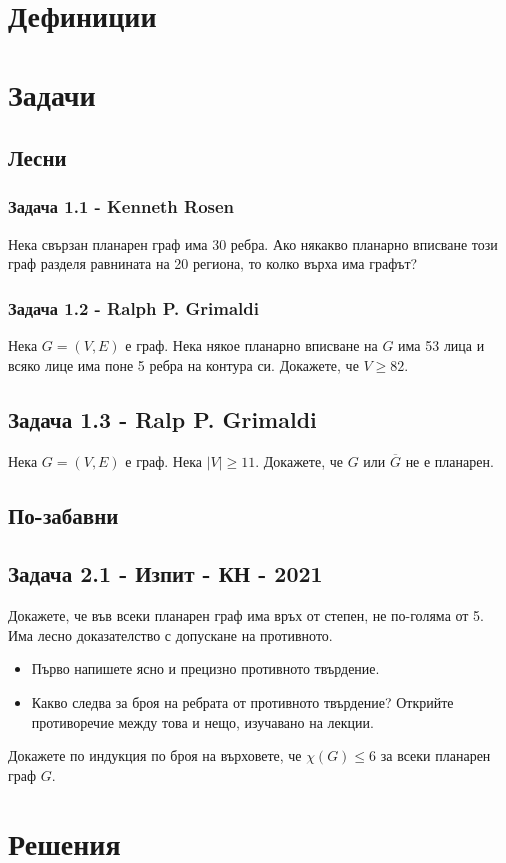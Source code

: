 \documentclass[12pt]{article}
\begin{document}
\section*{Дефиниции}

\section*{Задачи}

\subsection*{Лесни}
\subsubsection*{Задача 1.1 - Kenneth Rosen}
Нека свързан планарен граф има 30 ребра. Ако някакво планарно вписване този граф разделя равнината на 20 региона, то колко върха има графът?
\subsubsection*{Задача 1.2 - Ralph P. Grimaldi}
Нека $G = (V, E)$ е граф. Нека някое планарно вписване на $G$ има 53 лица и всяко лице има поне 5 ребра на контура си. Докажете, че $V \geq 82$.
\subsection*{Задача 1.3 - Ralp P. Grimaldi}
Нека $G = (V, E)$ е граф. Нека $|V| \geq 11$. Докажете, че $G$ или $\overline{G}$ не е планарен.

\subsection*{По-забавни}
\subsection*{Задача 2.1 - Изпит - КН - 2021}
Докажете, че във всеки планарен граф има връх от степен, не по-голяма от 5. Има лесно доказателство с допускане на противното.
\begin{itemize}
    \item Първо напишете ясно и прецизно противното твърдение.
    \item Какво следва за броя на ребрата от противното твърдение? Открийте противоречие между това и нещо, изучавано на лекции.
\end{itemize}
Докажете по индукция по броя на върховете, че $\chi(G) \leq 6$ за всеки планарен граф $G$.

\section*{Решения}
\end{document}
